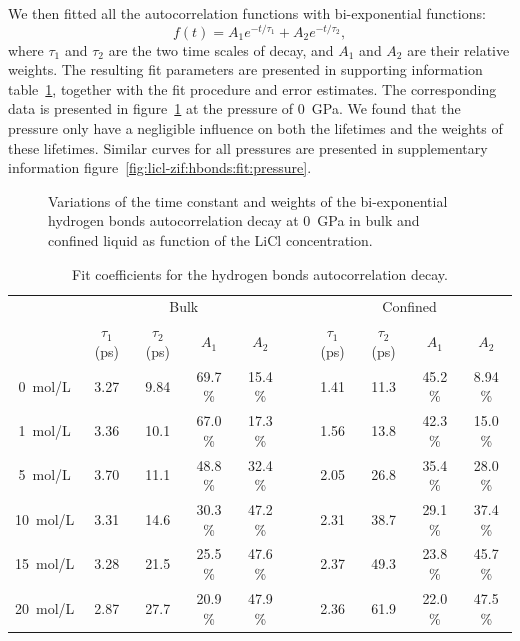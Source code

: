 \documentclass[thesis]{subfiles}
\begin{document}
We then fitted all the autocorrelation functions with bi-exponential functions:
\[ f(t) = A_1 e^{-t / \tau_1} + A_2 e^{-t / \tau_2}, \]
where $\tau_1$ and $\tau_2$ are the two time scales of decay, and $A_1$ and
$A_2$ are their relative weights. The resulting fit parameters are presented in
supporting information table~\ref{table:licl-zif:hbonds}, together with the fit
procedure and error estimates. The corresponding data is presented in
figure~\ref{fig:licl-zif:hbonds:fit} at the pressure of \SI{0}{GPa}. We found that the
pressure only have a negligible influence on both the lifetimes and the weights
of these lifetimes. Similar curves for all pressures are presented in
supplementary information figure~\ref{fig:licl-zif:hbonds:fit:pressure}.

\begin{figure}[ht]
    \centering
    
    \caption{Variations of the time constant and weights of the bi-exponential
    hydrogen bonds autocorrelation decay at \SI{0}{GPa} in bulk and confined
    liquid as function of the LiCl concentration.}
    \label{fig:licl-zif:hbonds:fit}
\end{figure}

\begin{table}[ht]
    \caption{Fit coefficients for the hydrogen bonds autocorrelation decay.}
    \label{table:licl-zif:hbonds}
    \centering
    \renewcommand{\arraystretch}{1.3}
    \begin{tabular}{c c c c c c c c c c}
        \toprule
        \multicolumn{1}{c}{~} & \multicolumn{4}{c}{Bulk}                          &~& \multicolumn{4}{c}{Confined} \\
        \multicolumn{1}{c}{~} & $\tau_1$ (ps) & $\tau_2$ (ps) & $A_1$   & $A_2$   &~& $\tau_1$ (ps) & $\tau_2$ (ps) & $A_1$   & $A_2$   \\
        \midrule
        \SI{0}{mol/L}         &    3.27       &    9.84       & 69.7 \% & 15.4 \% &~&  1.41         &  11.3         & 45.2 \% & 8.94 \% \\
        \SI{1}{mol/L}         &    3.36       &    10.1       & 67.0 \% & 17.3 \% &~&  1.56         &  13.8         & 42.3 \% & 15.0 \% \\
        \SI{5}{mol/L}         &    3.70       &    11.1       & 48.8 \% & 32.4 \% &~&  2.05         &  26.8         & 35.4 \% & 28.0 \% \\
        \SI{10}{mol/L}        &    3.31       &    14.6       & 30.3 \% & 47.2 \% &~&  2.31         &  38.7         & 29.1 \% & 37.4 \% \\
        \SI{15}{mol/L}        &    3.28       &    21.5       & 25.5 \% & 47.6 \% &~&  2.37         &  49.3         & 23.8 \% & 45.7 \% \\
        \SI{20}{mol/L}        &    2.87       &    27.7       & 20.9 \% & 47.9 \% &~&  2.36         &  61.9         & 22.0 \% & 47.5 \% \\
        \bottomrule
    \end{tabular}
\end{table}
\end{document}
